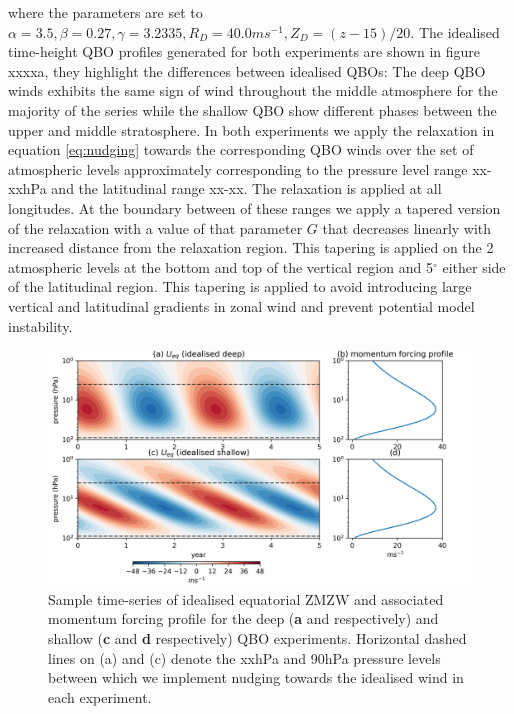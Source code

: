 where the parameters are set to $\alpha = 3.5, \beta = 0.27, \gamma = 3.2335, R_D = 40.0 ms^{-1}, Z_{D} = (z - 15)/20$. The idealised time-height QBO profiles generated for both experiments are shown in figure xxxxa, they highlight the differences between idealised QBOs: The deep QBO winds exhibits the same sign of wind throughout the middle atmosphere for the majority of the series while the shallow QBO show different phases between the upper and middle stratosphere. In both experiments we apply the relaxation in equation \ref{eq:nudging} towards the corresponding QBO winds over the set of atmospheric levels approximately corresponding to the pressure level range xx-xxhPa and the latitudinal range xx-xx. The relaxation is applied at all longitudes. At the boundary between of these ranges we apply a tapered version of the relaxation with a value of that parameter $G$ that decreases linearly with increased distance from the relaxation region. This tapering is applied on the 2 atmospheric levels at the bottom and top of the vertical region and 5$^\circ$ either side of the latitudinal region. This tapering is applied to avoid introducing large vertical and latitudinal gradients in zonal wind and prevent potential model instability. 

\begin{figure}[h!]
\begin{center}
\noindent\includegraphics[width = \linewidth]{Figures/Figures-deepQBO/Idealised_QBO_features.png}
\caption[Idealised QBO winds used for nudging experiments]{Sample time-series of idealised equatorial ZMZW and associated momentum forcing profile for the deep (\textbf{a} and  respectively) and shallow (\textbf{c} and \textbf{d} respectively) QBO experiments. Horizontal dashed lines on (a) and (c) denote the xxhPa and 90hPa pressure levels between which we implement nudging towards the idealised wind in each experiment.}
\label{fig:Idealised_QBO_samples}
\end{center}
\end{figure}


